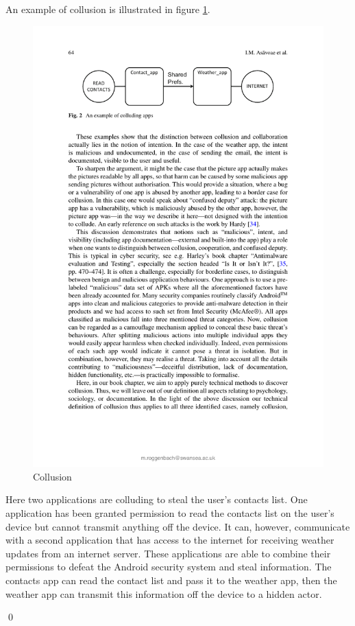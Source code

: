 \begin{myEx}

An example of collusion is illustrated in figure \ref{fig:collusionExample}.\\

\begin{figure}[h!]
  \centering
  \includegraphics[width=\textwidth]{graphics/CollusionExample}
  \caption{Collusion}
  \label{fig:collusionExample}
\end{figure}

Here two applications are colluding to steal the user's contacts list.  One application has been granted permission to read the contacts list on the user's device but cannot transmit anything off the device.  It can, however, communicate with a second application that has access to the internet for receiving weather updates from an internet server.  These applications are able to combine their permissions to defeat the Android security system and steal information.  The contacts app can read the contact list and pass it to the weather app, then the weather app can transmit this information off the device to a hidden actor.

\qed
\end{myEx}

